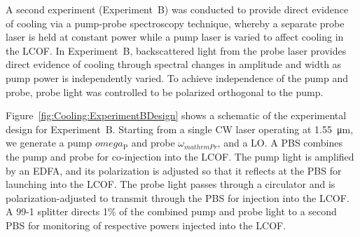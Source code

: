 A second experiment (Experiment~B) was conducted to provide direct evidence of cooling via a pump-probe spectroscopy technique, whereby a separate probe laser is held at constant power while a pump laser is varied to affect cooling in the \ac{LCOF}. In Experiment~B, backscattered light from the probe laser provides direct evidence of cooling through spectral changes in amplitude and width as pump power is independently varied. To achieve independence of the pump and probe, probe light was controlled to be polarized orthogonal to the pump.

Figure~\ref{fig:Cooling:ExperimentBDesign} shows a schematic of the experimental design for Experiment~B. Starting from a single \ac{CW} laser operating at \SI{1.55}{\micro\meter}, we generate a pump \(omega_{\mathrm{P}}\) and probe \(\omega_{mathrm{Pr}}\), and a \ac{LO}. A \ac{PBS} combines the pump and probe for co-injection into the \ac{LCOF}. The pump light is amplified by an \ac{EDFA}, and its polarization is adjusted so that it reflects at the \ac{PBS} for launching into the \ac{LCOF}. The probe light passes through a circulator and is polarization-adjusted to transmit through the \ac{PBS} for injection into the \ac{LCOF}. A 99-1 splitter directs 1\% of the combined pump and probe light to a second \ac{PBS} for monitoring of respective powers injected into the \ac{LCOF}.

